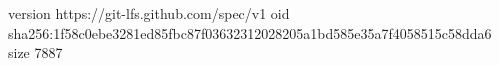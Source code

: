 version https://git-lfs.github.com/spec/v1
oid sha256:1f58c0ebe3281ed85fbc87f03632312028205a1bd585e35a7f4058515c58dda6
size 7887
